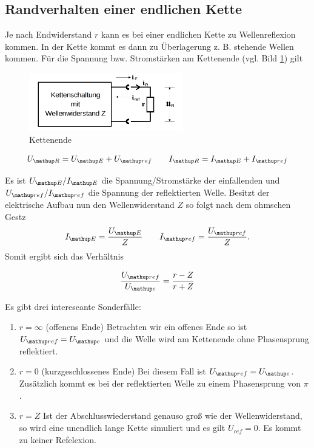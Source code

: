 \subsection{Randverhalten einer endlichen Kette}
Je nach Endwiderstand $r$ kann es bei einer endlichen Kette 
zu Wellenreflexion kommen. In der Kette kommt es dann
zu Überlagerung z. B. stehende Wellen kommen.
Für die Spannung bzw. Stromstärken am Kettenende (vgl. Bild \ref{fig:kettenende}) gilt

\begin{figure}
  \centering
  \includegraphics[width=0.6\textwidth]{bilder/wellenwiderstand.png}
  \caption{Kettenende}
  \label{fig:kettenende}
\end{figure}

\begin{equation*}
U\ua{R}=U\ua{E}+U\ua{ref} \qquad I\ua{R}=I\ua{E}+I\ua{ref}
\end{equation*}

Es ist $U\ua{E}/I\ua{E}$ die Spannung/Stromstärke der einfallenden und $U\ua{ref}/I\ua{ref}$ die Spannung der reflektierten 
Welle. Besitzt der elektrische Aufbau nun den Wellenwiderstand $Z$ so folgt nach dem
ohmschen Gestz
\begin{equation*}
I\ua{E}=\frac{U\ua{E}}{Z} \qquad I\ua{ref}=\frac{U\ua{ref}}{Z}.
\end{equation*}
Somit ergibt sich das Verhältnis

\begin{equation*}
\frac{U\ua{ref}}{U\ua{e}}=\frac{r-Z}{r+Z}
\end{equation*}

Es gibt drei intereseante Sonderfälle:

\renewcommand{\labelenumi}{\alph{enumi})}
\begin{enumerate}
\item{ $r=\infty$ (offenens Ende) \newline
Betrachten wir ein offenes Ende so ist $U\ua{ref}=U\ua{e}$ und die Welle wird am Kettenende ohne Phasensprung reflektiert.}
\item{ $r=0$ (kurzgeschlossenes Ende) \newline
Bei diesem Fall ist $U\ua{ref}=U\ua{e}$. Zusätzlich kommt es bei der reflektierten Welle zu einem Phasensprung von $\pi$.}
\item{ $r=Z$ \newline
Ist der Abschlusswiederstand genauso groß wie der Wellenwiderstand, so wird eine unendlich lange Kette simuliert und 
es gilt $U_{ref}=0$. Es kommt zu keiner Refelexion.}
\end{enumerate}

